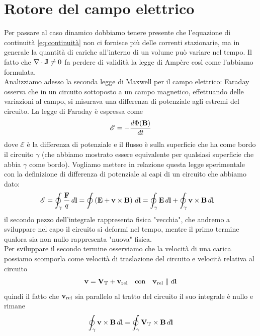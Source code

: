 \section{Rotore del campo elettrico}
Per passare al caso dinamico dobbiamo tenere presente che l'equazione di continuità \eqref{eq:continuità} non ci fornisce più delle correnti 
stazionarie, ma in generale la quantità di cariche all'interno di un volume può variare nel tempo. Il fatto che $ \nabla\cdot\mathbf{ J } \neq 0 $
fa perdere di validità la legge di Ampère così come l'abbiamo formulata.\\
Analizziamo adesso la seconda legge di Maxwell per il 
campo elettrico: Faraday osserva che in un circuito sottoposto a un campo magnetico, effettuando delle variazioni al campo, si misurava una 
differenza di potenziale agli estremi del circuito. La legge di Faraday è espressa come
\begin{equation}
  \mathscr{E} = - \frac{d \Phi (\mathbf{ B })}{dt}
\end{equation}
dove $ \mathscr{E} $ è la differenza di potenziale e il flusso è sulla superficie che ha come bordo il circuito $ \gamma $ (che abbiamo mostrato 
essere equivalente per qualsiasi superficie che abbia $ \gamma $ come bordo). Vogliamo mettere in relazione questa legge sperimentale con la 
definizione di differenza di potenziale ai capi di un circuito che abbiamo dato:
\begin{align}
  \mathscr{E} &= \oint_{\gamma} \frac{\mathbf{ F }}{q} \, d\mathbf{ l } = \oint \left( \mathbf{ E } +  \mathbf{ v } \times \mathbf{ B } \right) \, d\mathbf{ l } 
  = \oint_{\gamma} \mathbf{ E } \, d\mathbf{ l } + \oint_{\gamma} \mathbf{ v } \times \mathbf{ B } \, d\mathbf{ l }
\end{align}
il secondo pezzo dell'integrale rappresenta fisica "vecchia", che andremo a sviluppare nel capo il circuito si deformi nel tempo, mentre il primo 
termine qualora sia non nullo rappresenta "nuova" fisica.\\
Per sviluppare il secondo termine osserviamo che la velocità di una carica possiamo scomporla come velocità di traslazione del circuito e 
velocità relativa al circuito
\begin{equation}
  \mathbf{ v } = \mathbf{ V }_{\text{T}} + \mathbf{ v }_{\text{rel}} \quad \text{con} \quad \mathbf{ v }_{\text{rel}} \parallel d\mathbf{ l }
\end{equation}
quindi il fatto che $ \mathbf{ v }_{\text{rel}} $ sia parallelo al tratto del circuito il suo integrale è nullo e rimane
\begin{align}
  \oint_{\gamma} \mathbf{ v } \times \mathbf{ B } \, d\mathbf{ l } = \oint_{\gamma} \mathbf{ V }_{\text{T}} \times \mathbf{ B } \, d\mathbf{ l }
\end{align}


